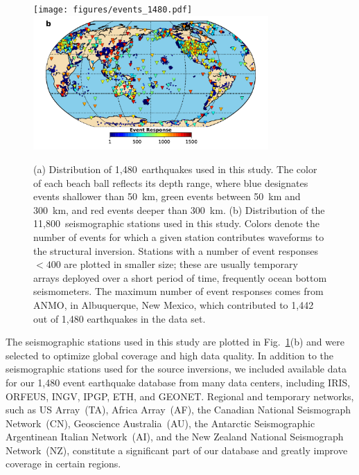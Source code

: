 \documentclass[extra,mreferee]{gji}
\begin{document}
\begin{figure}
  \centering
  \texttt{[image: figures/events\_1480.pdf]} \\
  \includegraphics[width=0.8\textwidth]{figures/station_map.pdf}
  \caption{\small{(a) Distribution of 1,480~earthquakes used in this study. The color of each beach ball reflects its depth range, where blue designates events shallower than 50~km, green events between 50~km and 300~km, and red events deeper than 300~km.
  (b) Distribution of the 11,800~seismographic stations used in this study. Colors denote the number of events for which a given station contributes waveforms to the structural inversion. Stations with a number of event responses $<400$ are plotted in smaller size; these are usually temporary arrays deployed over a short period of time, frequently ocean bottom seismometers. The maximum number of event responses comes from ANMO, in Albuquerque, New Mexico, which contributed to 1,442 out of 1,480 earthquakes in the data set.
  }}
  \label{fig:eventsstations}
\end{figure}

The seismographic stations used in this study are plotted in Fig.~\ref{fig:eventsstations}(b) and
were selected to optimize global coverage
and high data quality.
In addition to the seismographic  stations used for the source inversions,
we included available data for our 1,480 event earthquake database from many data centers,
including IRIS, ORFEUS, INGV, IPGP, ETH, and GEONET.
Regional and temporary networks,
such as US Array~(TA),
Africa Array~(AF), the Canadian National Seismograph Network~(CN), Geoscience Australia~(AU),
the Antarctic Seismographic Argentinean Italian Network~(AI),
and the New Zealand National Seismograph Network~(NZ),
constitute a significant part
of our database and greatly improve coverage in certain regions.
\end{document}
